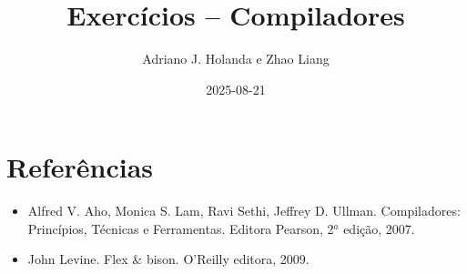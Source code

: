 \documentclass[11pt]{article}
\begin{document}
\title{Exercícios -- Compiladores}
\author{Adriano J. Holanda e Zhao Liang}
\date{2025-08-21}
\maketitle


%

\section*{Referências}
\begin{itemize}
\item Alfred V. Aho, Monica S. Lam, Ravi Sethi, Jeffrey
  D. Ullman. Compiladores: Princípios, Técnicas e Ferramentas. Editora
  Pearson, 2$^a$ edição, 2007.
\item John Levine. Flex \& bison. O'Reilly editora, 2009.
\end{itemize}
\end{document}
